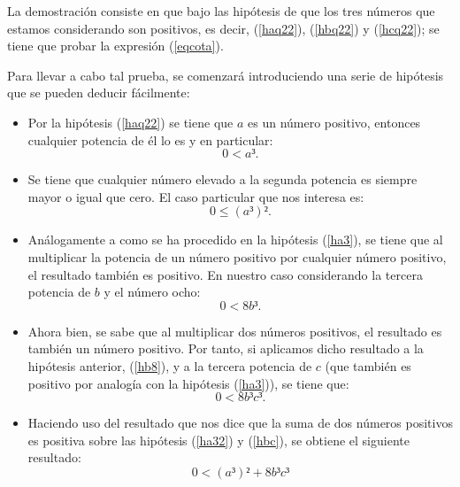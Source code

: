 \begin{demostracion}
  La demostración consiste en que bajo las hipótesis de que los tres
  números que estamos considerando son positivos, es decir,
  (\ref{haq22}), (\ref{hbq22}) y (\ref{hcq22}); se tiene que probar la
  expresión (\ref{eqcota}).

  Para llevar a cabo tal prueba, se comenzará introduciendo una serie
  de hipótesis que se pueden deducir fácilmente:
  \begin{itemize}
  \item Por la hipótesis (\ref{haq22}) se tiene que \(a\) es un
    número positivo, entonces cualquier potencia de él lo es y en
    particular:
    \begin{equation}\label{ha3}\tag{ha3}
      0 < a³.
    \end{equation}

  \item Se tiene que cualquier número elevado a la segunda potencia
    es siempre mayor o igual que cero. El caso particular que nos
    interesa es:
    \begin{equation}\label{ha32}\tag{ha32}
      0 ≤ (a³)².
    \end{equation}

  \item Análogamente a como se ha procedido en la hipótesis (\ref{ha3}),
    se tiene que al multiplicar la potencia de un número positivo por
    cualquier número positivo, el resultado también es positivo. En
    nuestro caso considerando la tercera potencia de \(b\) y el número
    ocho:
    \begin{equation}\label{hb8}\tag{hb8}
      0 < 8b³.
    \end{equation}

  \item Ahora bien, se sabe que al multiplicar dos números positivos, el
    resultado es también un número positivo. Por tanto, si aplicamos
    dicho resultado a la hipótesis anterior, (\ref{hb8}), y a la tercera
    potencia de \(c\) (que también es positivo por analogía con la
    hipótesis (\ref{ha3})), se tiene que:
    \begin{equation}\label{hbc}\tag{hbc}
      0 < 8b³c³.
    \end{equation}

  \item Haciendo uso del resultado que nos dice que la suma de dos
    números positivos es positiva sobre las hipótesis (\ref{ha32}) y
    (\ref{hbc}), se obtiene el siguiente resultado:
    \begin{equation}\label{hdenom1}\tag{hdenom1}
       0 < (a³)²+8b³c³
     \end{equation}


\end{itemize}
\end{demostracion}
